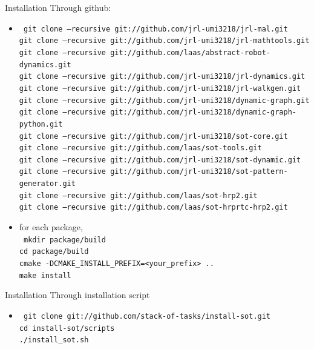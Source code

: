 \begin{frame} {Installation}
  Through github:
  \begin{itemize}
  \item \texttt {\tiny
    git clone --recursive git://github.com/jrl-umi3218/jrl-mal.git\\
    git clone --recursive git://github.com/jrl-umi3218/jrl-mathtools.git\\
    git clone --recursive git://github.com/laas/abstract-robot-dynamics.git\\
    git clone --recursive git://github.com/jrl-umi3218/jrl-dynamics.git\\
    git clone --recursive git://github.com/jrl-umi3218/jrl-walkgen.git\\
    git clone --recursive git://github.com/jrl-umi3218/dynamic-graph.git\\
    git clone --recursive git://github.com/jrl-umi3218/dynamic-graph-python.git\\
    git clone --recursive git://github.com/jrl-umi3218/sot-core.git\\
    git clone --recursive git://github.com/laas/sot-tools.git\\
    git clone --recursive git://github.com/jrl-umi3218/sot-dynamic.git\\
    git clone --recursive git://github.com/jrl-umi3218/sot-pattern-generator.git\\
    git clone --recursive git://github.com/laas/sot-hrp2.git\\
    git clone --recursive git://github.com/laas/sot-hrprtc-hrp2.git\\
  }
    \pause
  \item for each package,\\
    \texttt {\tiny
      mkdir package/build\\
      cd package/build\\
      cmake -DCMAKE\_INSTALL\_PREFIX=<your\_prefix> ..\\
      make install}      
    \end{itemize}
\end{frame}

%
%

\begin{frame} {Installation}
  Through installation script
  \begin{itemize}
  \item \texttt{\tiny
    git clone git://github.com/stack-of-tasks/install-sot.git\\
    cd install-sot/scripts\\
    ./install\_sot.sh
  }
  \end{itemize}
\end{frame}

